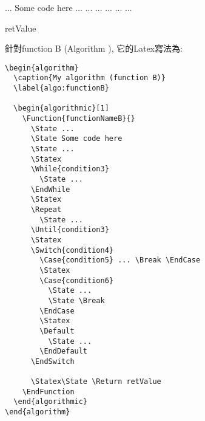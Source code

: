 
\newpage
\begin{algorithm}
  \caption{My algorithm (function B)}
  \label{algo:functionB}

  \begin{algorithmic}[1]
      \State ...
      \State Some code here
      \State ...
      \Statex
        \State ...
      \EndWhile
      \Statex
      \Repeat
        \State ...
      \Statex
         ... \Break \EndCase
        \Statex
          \State ...
          \State \Break
        \EndCase
        \Statex
        \Default
          \State ...
        \EndDefault
      \EndSwitch

      \Statex\State \Return retValue
    \EndFunction
  \end{algorithmic}
\end{algorithm}

\newpage
針對function B (Algorithm ), 它的Latex寫法為:
    \EmptyLine
\begin{fmpage}{\textwidth}
  \begin{verbatim}
\begin{algorithm}
  \caption{My algorithm (function B)}
  \label{algo:functionB}

  \begin{algorithmic}[1]
    \Function{functionNameB}{}
      \State ...
      \State Some code here
      \State ...
      \Statex
      \While{condition3}
        \State ...
      \EndWhile
      \Statex
      \Repeat
        \State ...
      \Until{condition3}
      \Statex
      \Switch{condition4}
        \Case{condition5} ... \Break \EndCase
        \Statex
        \Case{condition6}
          \State ...
          \State \Break
        \EndCase
        \Statex
        \Default
          \State ...
        \EndDefault
      \EndSwitch

      \Statex\State \Return retValue
    \EndFunction
  \end{algorithmic}
\end{algorithm}
  \end{verbatim}
\end{fmpage}
